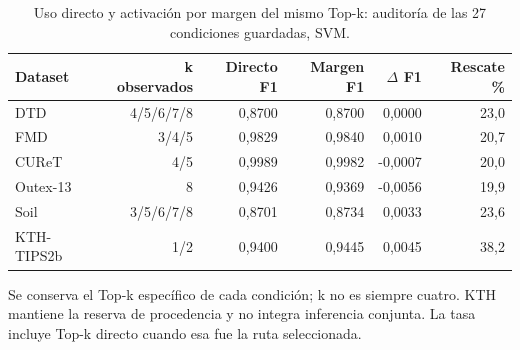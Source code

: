 \begin{table}[!htbp]\centering
\fontsize{9}{11}\selectfont\setlength{\tabcolsep}{4pt}
\caption{Uso directo y activación por margen del mismo Top-k: auditoría de las 27 condiciones guardadas, SVM.}\label{tab:tm-cascada}
\begin{tabular}{@{}lrrrrr@{}}\toprule
Dataset & k observados & Directo F1 & Margen F1 & $\Delta$ F1 & Rescate \%\\\midrule
DTD & 4/5/6/7/8 & 0,8700 & 0,8700 & 0,0000 & 23,0\\
FMD & 3/4/5 & 0,9829 & 0,9840 & 0,0010 & 20,7\\
CUReT & 4/5 & 0,9989 & 0,9982 & -0,0007 & 20,0\\
Outex-13 & 8 & 0,9426 & 0,9369 & -0,0056 & 19,9\\
Soil & 3/5/6/7/8 & 0,8701 & 0,8734 & 0,0033 & 23,6\\
KTH-TIPS2b & 1/2 & 0,9400 & 0,9445 & 0,0045 & 38,2\\
\bottomrule\end{tabular}
\par\smallskip\begin{minipage}{0.98\textwidth}\footnotesize Se conserva el Top-k específico de cada condición; k no es siempre cuatro. KTH mantiene la reserva de procedencia y no integra inferencia conjunta. La tasa incluye Top-k directo cuando esa fue la ruta seleccionada.\end{minipage}
\end{table}
